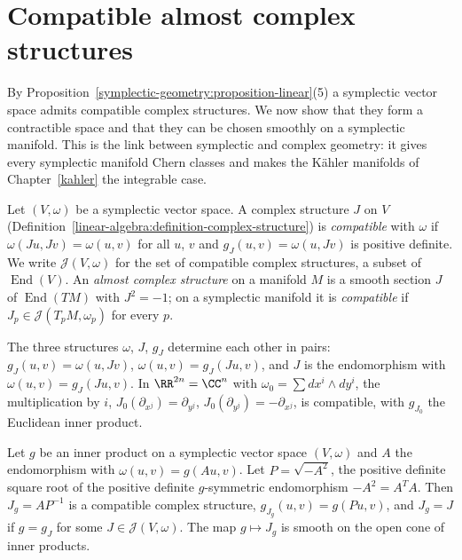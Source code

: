 \section{Compatible almost complex structures}\label{symplectic-geometry:section-almost-complex}

By Proposition~\ref{symplectic-geometry:proposition-linear}(5) a symplectic vector space admits compatible complex structures. We now show that they form a contractible space and that they can be chosen smoothly on a
symplectic manifold. This is the link between symplectic and complex geometry: it gives every symplectic manifold Chern classes and makes the K\"ahler manifolds of Chapter~\ref{kahler} the integrable case.

\begin{definition}\label{symplectic-geometry:definition-compatible}
Let $(V, \omega)$ be a symplectic vector space. A complex structure $J$ on $V$ (Definition~\ref{linear-algebra:definition-complex-structure}) is \emph{compatible} with $\omega$ if $\omega(Ju, Jv) = \omega(u, v)$ for all $u$, $v$ and
$g_J(u, v) = \omega(u, Jv)$ is positive definite. We write $\mathcal{J}(V, \omega)$ for the set of compatible complex structures, a subset of $\operatorname{End}(V)$. An \emph{almost complex structure} on a manifold
$M$ is a smooth section $J$ of $\operatorname{End}(TM)$ with $J^2 = -1$; on a symplectic manifold it is \emph{compatible} if $J_p \in \mathcal{J}(T_pM, \omega_p)$ for every $p$.
\end{definition}

The three structures $\omega$, $J$, $g_J$ determine each other in pairs: $g_J(u, v) = \omega(u, Jv)$, $\omega(u, v) = g_J(Ju, v)$, and $J$ is the endomorphism with $\omega(u, v) = g_J(Ju, v)$. In $\RR^{2n} = \CC^n$ with
$\omega_0 = \sum dx^i \wedge dy^i$, the multiplication by $i$, $J_0(\partial_{x^j}) = \partial_{y^j}$, $J_0(\partial_{y^j}) = -\partial_{x^j}$, is compatible, with $g_{J_0}$ the Euclidean inner product.

\begin{lemma}\label{symplectic-geometry:lemma-polar}
Let $g$ be an inner product on a symplectic vector space $(V, \omega)$ and $A$ the endomorphism with $\omega(u, v) = g(Au, v)$. Let $P = \sqrt{-A^2}$, the positive definite square root of the positive definite
$g$-symmetric endomorphism $-A^2 = A^TA$. Then $J_g = AP^{-1}$ is a compatible complex structure, $g_{J_g}(u, v) = g(Pu, v)$, and $J_g = J$ if $g = g_J$ for some $J \in \mathcal{J}(V, \omega)$. The map
$g \mapsto J_g$ is smooth on the open cone of inner products.
\end{lemma}

